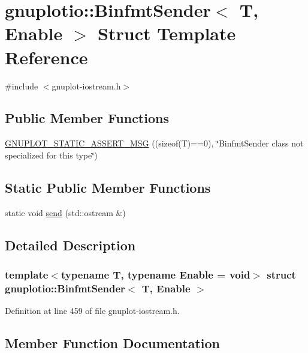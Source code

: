 \hypertarget{structgnuplotio_1_1_binfmt_sender}{}\section{gnuplotio\+:\+:Binfmt\+Sender$<$ T, Enable $>$ Struct Template Reference}
\label{structgnuplotio_1_1_binfmt_sender}


{\ttfamily \#include $<$gnuplot-\/iostream.\+h$>$}

\subsection*{Public Member Functions}
\begin{DoxyCompactItemize}
\item 
\hyperlink{structgnuplotio_1_1_binfmt_sender_a02d7d348067625dc099e27249c24780a}{G\+N\+U\+P\+L\+O\+T\+\_\+\+S\+T\+A\+T\+I\+C\+\_\+\+A\+S\+S\+E\+R\+T\+\_\+\+M\+SG} ((sizeof(T)==0), \char`\"{}Binfmt\+Sender class not specialized for this type\char`\"{})
\end{DoxyCompactItemize}
\subsection*{Static Public Member Functions}
\begin{DoxyCompactItemize}
\item 
static void \hyperlink{structgnuplotio_1_1_binfmt_sender_a762010e3172c02e981252f93185b29c8}{send} (std\+::ostream \&)
\end{DoxyCompactItemize}


\subsection{Detailed Description}
\subsubsection*{template$<$typename T, typename Enable = void$>$\newline
struct gnuplotio\+::\+Binfmt\+Sender$<$ T, Enable $>$}



Definition at line 459 of file gnuplot-\/iostream.\+h.



\subsection{Member Function Documentation}
\mbox{\label{structgnuplotio_1_1_binfmt_sender_a02d7d348067625dc099e27249c24780a}} 
